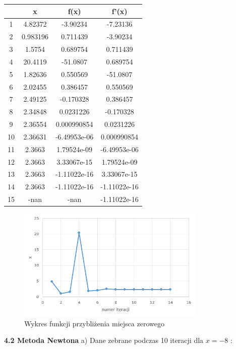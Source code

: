 \documentclass{article}
\begin{document}
\begin{table}[H]
    \centering
    \begin{tabular}{|c|c||c||c|} \hline
     & x & f(x) & f'(x) \\ \hline
1 & 4.82372 & -3.90234 & -7.23136\\ \hline
2 & 0.983196 & 0.711439 & -3.90234\\ \hline
3 & 1.5754 & 0.689754 & 0.711439\\ \hline
4 & 20.4119 & -51.0807 & 0.689754\\ \hline
5 & 1.82636 & 0.550569 & -51.0807\\ \hline
6 & 2.02455 & 0.386457 & 0.550569\\ \hline
7 & 2.49125 & -0.170328 & 0.386457\\ \hline
8 & 2.34848 & 0.0231226 & -0.170328\\ \hline
9 & 2.36554 & 0.000990854 & 0.0231226\\ \hline
10 & 2.36631 & -6.49953e-06 & 0.000990854\\ \hline
11 & 2.3663 & 1.79524e-09 & -6.49953e-06\\ \hline
12 & 2.3663 & 3.33067e-15 & 1.79524e-09\\ \hline
13 & 2.3663 & -1.11022e-16 & 3.33067e-15\\ \hline
14 & 2.3663 & -1.11022e-16 & -1.11022e-16\\ \hline
15 & -nan & -nan & -1.11022e-16\\ \hline

    \end{tabular}

    \label{tab:my_label}
\end{table}

\begin{figure}[H]
\centering
\includegraphics[width=9cm]{sd.png}
\caption{ Wykres funkcji przybliżenia miejsca zerowego}
\label{fig:obrazek sd}
\end{figure}

\newpage
\textbf{4.2 Metoda Newtona}
\newline\newline
a) Dane zebrane podczas 10 iteracji dla $x=-8$ :
\end{document}
